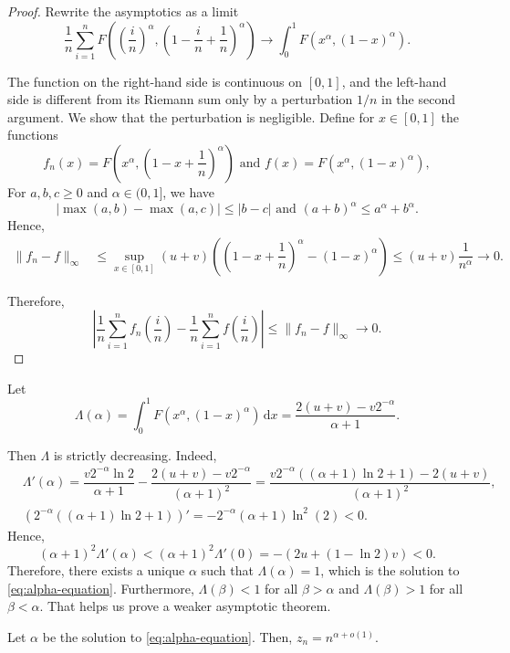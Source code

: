 \begin{proof}
  Rewrite the asymptotics as a limit
  $$\dfrac{1}{n}\sum\limits_{i=1}^n F\left(\left(\dfrac{i}{n}\right)^\alpha, \left(1-\dfrac{i}{n}+\dfrac{1}{n}\right)^\alpha\right) \to \int_0^1 F(x^\alpha, (1-x)^\alpha).$$

  The function on the right-hand side is continuous on $[0,1]$, and the left-hand side is different from its Riemann sum only by a perturbation $1/n$ in the second argument. We show that the perturbation is negligible. Define for $x\in [0,1]$ the functions
  $$f_n(x) = F\left(x^\alpha, \left(1-x+\dfrac{1}{n}\right)^\alpha\right) \text{ and } f(x) = F(x^\alpha, (1-x)^\alpha),$$
  For $a,b,c \ge 0$ and $\alpha \in (0,1]$, we have
  $$|\max(a,b) - \max(a,c)| \le |b-c| \text{ and }
    (a+b)^\alpha \le a^\alpha + b^\alpha.$$
  Hence,
  \begin{align*}
    \|f_n-f\|_\infty
     & \le \sup\limits_{x\in[0,1]}(u+v)\left(\left(1-x+\dfrac{1}{n}\right)^\alpha - (1-x)^\alpha\right) \le (u+v)\dfrac{1}{n^\alpha} \to 0.
  \end{align*}

  Therefore,
  $$\left|\dfrac{1}{n}\sum\limits_{i=1}^n f_n\left(\dfrac{i}{n}\right) - \dfrac{1}{n}\sum\limits_{i=1}^n f\left(\dfrac{i}{n}\right)\right| \le \|f_n-f\|_\infty \to 0.$$
\end{proof}

Let
$$\Lambda(\alpha) = \int_0^1 F(x^\alpha, (1-x)^\alpha) \,\mathrm{d}x = \dfrac{2(u+v)-v2^{-\alpha}}{\alpha+1}.$$

Then $\Lambda$ is strictly decreasing. Indeed,
\begin{align*}
   & \Lambda'(\alpha) = \dfrac{v2^{-\alpha}\ln 2}{\alpha+1} - \dfrac{2(u+v)-v2^{-\alpha}}{(\alpha+1)^2} = \dfrac{v2^{-\alpha}((\alpha+1)\ln 2 + 1) - 2(u+v)}{(\alpha+1)^2}, \\
   & (2^{-\alpha}((\alpha+1)\ln 2 + 1))' = -2^{-\alpha}(\alpha+1)\ln^2(2) < 0.
\end{align*}
Hence,
$$(\alpha+1)^2\Lambda'(\alpha) < (\alpha+1)^2\Lambda'(0) = -(2u + (1-\ln 2)v) < 0.$$
Therefore, there exists a unique $\alpha$ such that $\Lambda(\alpha) = 1$, which is the solution to \eqref{eq:alpha-equation}. Furthermore, $\Lambda(\beta) < 1$ for all $\beta > \alpha$ and $\Lambda(\beta) > 1$ for all $\beta < \alpha$. That helps us prove a weaker asymptotic theorem.

\begin{theorem}
  \label{thm:weaker-asymptotics}
  Let $\alpha$ be the solution to \eqref{eq:alpha-equation}. Then, $z_n = n^{\alpha + o(1)}$.
\end{theorem}

